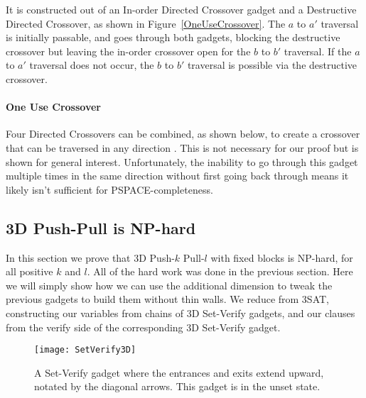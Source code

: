 It is constructed out of an In-order Directed Crossover gadget and a Destructive Directed Crossover, as shown in Figure~\ref{OneUseCrossover}. The $a$ to $a'$ traversal is initially passable, and goes through both gadgets,
blocking the destructive crossover but leaving the in-order crossover open for the $b$ to $b'$ traversal. If the $a$ to $a'$ traversal does not occur, the $b$ to $b'$ traversal is possible via the destructive crossover.

\paragraph{One Use Crossover} 
Four Directed Crossovers can be combined, as shown below, to create a crossover that can be traversed in any direction \cite{Push100}. This is not necessary for our proof but is shown for general interest. Unfortunately, the inability to go through this gadget multiple times in the same direction without first going back through means it likely isn't sufficient for PSPACE-completeness. 

\subsection{3D Push-Pull is NP-hard}
\label{3DNPhard}
In this section we prove that 3D Push-$k$ Pull-$l$ with fixed blocks is NP-hard, for all positive $k$ and $l$. All of the hard work was done in the previous section. Here we will simply show how we can use the additional dimension to tweak the previous gadgets to build them without thin walls. We reduce from 3SAT, constructing our variables from chains of 3D Set-Verify gadgets, and our clauses from the verify side of the corresponding 3D Set-Verify gadget.


\begin{wrapfigure}{r}{0.45\textwidth}
  \centering
    \texttt{[image: SetVerify3D]}
    \caption{A Set-Verify gadget where the entrances and exits extend upward, notated by the diagonal arrows. This gadget is in the unset state.}
    \label{3DSetVerify}
    \vspace{-2mm}
\end{wrapfigure}

